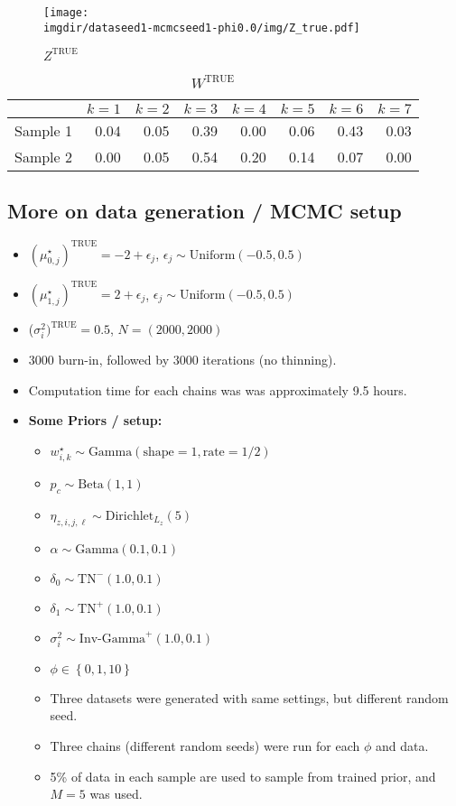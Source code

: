 \documentclass[10pt]{article} %
\newcommand{\bc}[1]{ \left\{#1\right\} }
\newcommand{\Gam}{ \text{Gamma} }
\newcommand{\InvGamma}{ \text{Inv-Gamma} }
\newcommand{\Uniform}{ \text{Uniform} }
\def\Dir{\text{Dirichlet}}
\def\TN{\text{TN}}
\def\true{\text{TRUE}}
\def\imgdir{../../results/test-sim-6-7-10}
\begin{document}
\begin{figure}[H]
  \begin{center}  %
    \texttt{[image: \\imgdir/dataseed1-mcmcseed1-phi0.0/img/Z\_true.pdf]}
  \end{center}
  \caption{$Z^\true$}
  \label{fig:Z-true}
\end{figure}

\begin{table}[ht]
  \centering
  \begin{tabular}{rrrrrrrr}
    \hline
    & $k=1$ & $k=2$ & $k=3$ & $k=4$ & $k=5$ & $k=6$ & $k=7$ \\
    \hline
    Sample 1 & 0.04 & 0.05 & 0.39 & 0.00 & 0.06 & 0.43 & 0.03 \\
    Sample 2 & 0.00 & 0.05 & 0.54 & 0.20 & 0.14 & 0.07 & 0.00 \\
    \hline
  \end{tabular}
  \caption{$W^\true$}
  \label{tab:W-true}
\end{table}

\subsection{More on data generation / MCMC setup}
\begin{itemize}
  \item $(\mu_{0,j}^\star)^\true=-2 + \epsilon_j$, $\epsilon_j \sim \Uniform(-0.5, 0.5)$
  \item $(\mu_{1,j}^\star)^\true=2 + \epsilon_j$, $\epsilon_j \sim \Uniform(-0.5, 0.5)$
  \item ($\sigma^2_i)^\true=0.5$, $N=(2000, 2000)$
  \item 3000 burn-in, followed by 3000 iterations (no thinning).
  \item Computation time for each chains was was approximately 9.5 hours.
  \item \textbf{Some Priors / setup:}
  \begin{itemize}
    \item $w^\star_{i,k} \sim \Gam(\text{shape}=1, \text{rate}=1/2)$
    \item $p_c \sim \text{Beta}(1, 1)$
    \item $\eta_{z, i,j,\ell} \sim \Dir_{L_z}(5)$
    \item $\alpha \sim \Gam(0.1, 0.1)$
    \item $\delta_0 \sim \TN^-(1.0, 0.1)$
    \item $\delta_1 \sim \TN^+(1.0, 0.1)$
    \item $\sigma^2_i \sim \InvGamma^+(1.0, 0.1)$
    \item $\phi\in\bc{0, 1, 10}$
    \item Three datasets were generated with same settings, but different
      random seed.
    \item Three chains (different random seeds) were run for each $\phi$ and data.
    \item 5\% of data in each sample are used to sample from trained prior, and
      $M=5$ was used.
  \end{itemize}
\end{itemize}
\end{document}
